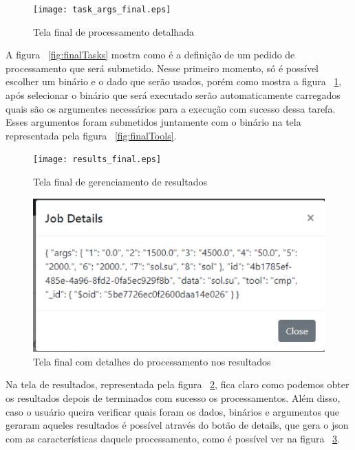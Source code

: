 \documentclass[11pt,twoside]{article}
\begin{document}
\begin{figure}[!h]
  \centering
  \texttt{[image: task\_args\_final.eps]}
  \caption{Tela final de processamento detalhada}
  \label{fig:finalDetailedTask}
\end{figure}

A figura ~\ref{fig:finalTasks} mostra como é a definição de um pedido de processamento que será submetido. Nesse primeiro momento, só é possível escolher um binário e o dado que serão usados, porém como mostra 
a figura ~\ref{fig:finalDetailedTask}, após selecionar o binário que será executado serão automaticamente carregados quais são os argumentes necessários para a execução com sucesso dessa tarefa. Esses argumentos
foram submetidos juntamente com o binário na tela representada pela figura ~\ref{fig:finalTools}.

\begin{figure}[!h]
  \centering
  \texttt{[image: results\_final.eps]}
  \caption{Tela final de gerenciamento de resultados}
  \label{fig:finalResults}
\end{figure}

\begin{figure}[!h]
  \centering
  \includegraphics[scale=0.6]{results_detail_final.eps}
  \caption{Tela final com detalhes do processamento nos resultados}
  \label{fig:finalResultsDetail}
\end{figure}

Na tela de resultados, representada pela figura ~\ref{fig:finalResults}, fica claro como podemos obter os resultados depois de terminados com sucesso os processamentos. Além disso, caso o usuário queira verificar 
quais foram os dados, binários e argumentos que geraram aqueles resultados é possível através do botão de details, que gera o json com as características daquele processamento, como é possível ver na 
figura ~\ref{fig:finalResultsDetail}.
\end{document}
